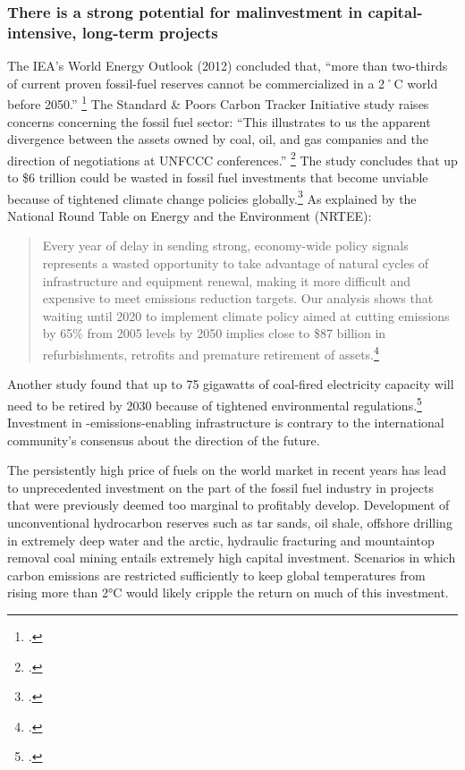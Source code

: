 	\subsubsection {There is a strong potential for malinvestment in capital-intensive, long-term projects}



The IEA's World Energy Outlook (2012) concluded that, ``more than two-thirds of current proven fossil-fuel reserves cannot be commercialized in a 2˚C world before 2050.'' \footcite{IEA2012}
The Standard \& Poors Carbon Tracker Initiative study raises concerns concerning the fossil fuel sector: ``This illustrates to us the apparent divergence between the assets owned by coal, oil, and gas companies and the direction of negotiations at UNFCCC conferences.'' \footcite{SandPConstrained}
The study concludes that up to \$6 trillion could be wasted in fossil fuel investments that become unviable because of tightened climate change policies globally.\footcite[][]{SixTrillionBubble}
As explained by the National Round Table on Energy and the Environment (NRTEE):
\begin{quote}
Every year of delay in sending strong, economy-wide policy signals represents a wasted opportunity to take advantage of natural cycles of infrastructure and equipment renewal, making it more difficult and expensive to meet emissions reduction targets. Our analysis shows that waiting until 2020 to implement climate policy aimed at cutting emissions by 65\% from 2005 levels by 2050 implies close to \$87 billion in refurbishments, retrofits and premature retirement of assets.\footcite[][p. 19]{FramingFuture}
\end{quote}
Another study found that up to 75 gigawatts of coal-fired electricity capacity will need to be retired by 2030 because of tightened environmental regulations.\footcite[][p. 10]{RisksInCoal}
Investment in -emissions-enabling infrastructure is contrary to the international community's consensus about the direction of the future.


The persistently high price of fuels on the world market in recent years has lead to unprecedented investment on the part of the fossil fuel industry in projects that were previously deemed too marginal to profitably develop. 
Development of unconventional hydrocarbon reserves such as tar sands, oil shale, offshore drilling in extremely deep water and the arctic, hydraulic fracturing and mountaintop removal coal mining entails extremely high capital investment. 
Scenarios in which carbon emissions are restricted sufficiently to keep global temperatures from rising more than 2°C would likely cripple the return on much of this investment.



